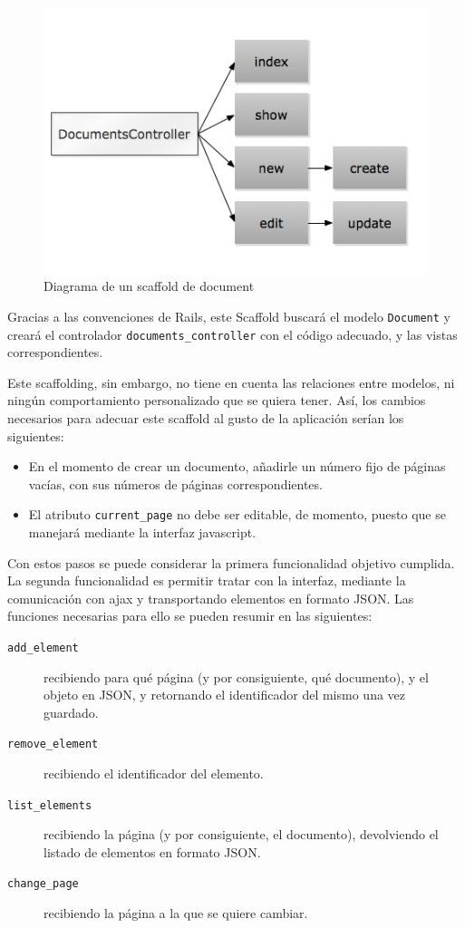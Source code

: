 \begin{figure}[h!]
\centering
\includegraphics[totalheight=9cm]{documentscaffold.jpg}
\caption{Diagrama de un scaffold de document}\label{fig:documentscaffold}
\end{figure}


Gracias a las convenciones de Rails, este Scaffold buscará el modelo \texttt{Document} y creará el controlador \texttt{documents\_controller} con el código adecuado, y las vistas correspondientes.

Este scaffolding, sin embargo, no tiene en cuenta las relaciones entre modelos, ni ningún comportamiento personalizado que se quiera tener. Así, los cambios necesarios para adecuar este scaffold al gusto de la aplicación serían los siguientes:

\begin{itemize}
  \item En el momento de crear un documento, añadirle un número fijo de páginas vacías, con sus números de páginas correspondientes.
  \item El atributo \texttt{current\_page} no debe ser editable, de momento, puesto que se manejará mediante la interfaz javascript.
\end{itemize}

Con estos pasos se puede considerar la primera funcionalidad objetivo cumplida. La segunda funcionalidad es permitir tratar con la interfaz, mediante la comunicación con ajax y transportando elementos en formato JSON. Las funciones necesarias para ello se pueden resumir en las siguientes:

\begin{description}
  \item[\texttt{add\_element}] recibiendo para qué página (y por consiguiente, qué documento), y el objeto en JSON, y retornando el identificador del mismo una vez guardado.
  \item[\texttt{remove\_element}] recibiendo el identificador del elemento.
  \item[\texttt{list\_elements}] recibiendo la página (y por consiguiente, el documento), devolviendo el listado de elementos en formato JSON.
  \item[\texttt{change\_page}] recibiendo la página a la que se quiere cambiar.
\end{description}

